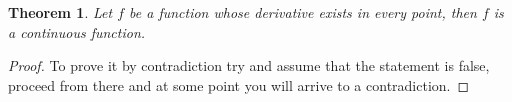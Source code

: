 \documentclass{article}
\begin{document}
\newtheorem{thm}{Theorem}
\begin{thm}
Let \(f\) be a function whose derivative exists in every point, then \(f\)
is a continuous function.
\end{thm}
\begin{proof}
To prove it by contradiction try and assume that the statement is false,
proceed from there and at some point you will arrive to a contradiction.
\end{proof}
\end{document}
